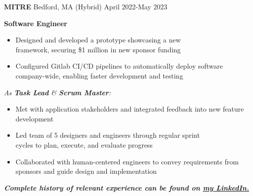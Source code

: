 \documentclass[10pt,a4paper,ragged2e,withhyper]{altacv}
\begin{document}
\begin{paracol}{2}
    \divider

    \large\color{emphasis}\textbf{MITRE} \small\faSuitcase Bedford, MA (Hybrid)
    \hfill\small\faCalendar April 2022-May 2023\par
    \textbf{\color{subheading}Software Engineer}\par
    \smallskip
    \normalsize

    \begin{itemize}
        \item Designed and developed a prototype showcasing a new \\ framework, securing \$1 million in new sponsor funding
        \item Configured Gitlab CI/CD pipelines to automatically deploy software company-wide, enabling faster development and testing
    \end{itemize}
    \smallskip
    \textit{As \textbf{Task Lead} \& \textbf{Scrum Master}:}
    \begin{itemize}
        \item Met with application stakeholders and integrated feedback into new feature development
        \item Led team of 5 designers and engineers through regular sprint \\ cycles to plan, execute, and evaluate progress
        \item Collaborated with human-centered engineers to convey requirements from sponsors and guide design and implementation
    \end{itemize}

    \begin{center}
        \textbf{\textit{Complete history of relevant experience can be found on \href{https://linkedin.com/in/james-d-tanner}{my LinkedIn.}}}
    \end{center}




\end{paracol}
\end{document}
